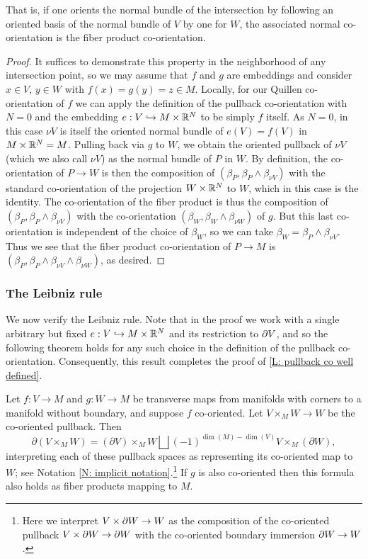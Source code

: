 That is, if one orients the normal bundle of the intersection by following an oriented basis of the normal bundle of $V$ by one for $W$,
the associated normal co-orientation is the fiber product co-orientation.

\begin{proof}
It suffices to demonstrate this property in the neighborhood of any intersection point, so we may assume that $f$ and $g$ are embeddings and consider $x\in V$, $y\in W$ with $f(x)=g(y)=z\in M$. Locally, for our Quillen co-orientation of $f$ we can apply the definition of the pullback co-orientation with  $N=0$ and the embedding $e:V\hookrightarrow M\times \mathbb{R}^N$ to be simply $f$ itself.
As $N=0$, in this case $\nu V$ is itself the oriented normal bundle of $e(V)=f(V)$ in  $M\times \mathbb{R}^N=M$. Pulling back via $g$ to $W$, we obtain the oriented pullback of $\nu V$ (which we also call $\nu V$) as the normal bundle of $P$ in $W$. By definition, the co-orientation of $P\to W$ is then the composition of $(\beta_P,\beta_P\wedge \beta_{\nu V})$ with the standard co-orientation of the projection $W\times \mathbb{R}^N$ to $W$, which in this case is the identity. The co-orientation of the fiber product is thus the composition of $(\beta_P,\beta_P\wedge \beta_{\nu V})$ with the co-orientation $(\beta_W,\beta_W\wedge \beta_{\nu W})$  of $g$. But this last co-orientation is independent of the choice of $\beta_W$, so we can take $\beta_W=\beta_P\wedge \beta_{\nu V}$. Thus we see that the fiber product co-orientation of $P\to M$ is $(\beta_P, \beta_P\wedge \beta_{\nu V}\wedge \beta_{\nu W})$, as desired.
\end{proof}






\subsubsection{The Leibniz rule} We  now verify  the Leibniz rule. Note that in the proof we work with a single arbitrary but fixed $e:V\hookrightarrow M\times \mathbb{R}^N$ and its restriction to $\partial V$, and so the following theorem holds for any such choice in the definition of the pullback co-orientation. Consequently,  this result completes the proof of \cref{L: pullback co well defined}.



\begin{proposition}\label{leibniz}
Let $f:V\to M$ and $g:W\to M$ be transverse maps from manifolds with corners to a manifold without boundary, and suppose $f$ co-oriented. Let $V \times_M W\to W$ be the co-oriented pullback.  Then
$$\partial (V \times_M W) = (\partial V) \times_M W \bigsqcup (-1)^{\dim(M)-\dim(V)} V \times_M (\partial W),$$
interpreting each of these pullback spaces as representing its co-oriented map to $W$; see Notation \ref{N: implicit notation}.\footnote{Here we interpret $V\times\partial W\to W$ as the composition of the co-oriented pullback $V\times\partial W\to \partial W$ with the co-oriented boundary immersion $\partial W\to W$.} If $g$ is also co-oriented then this formula also holds as fiber products mapping to $M$.
\end{proposition}

